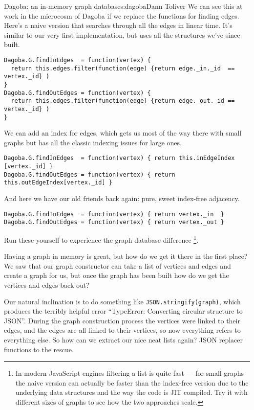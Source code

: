 \begin{aosachapter}{Dagoba: an in-memory graph database}{s:dagoba}{Dann Toliver}
We can see this at work in the microcosm of Dagoba if we replace the
functions for finding edges. Here's a naive version that searches
through all the edges in linear time. It's similar to our very first
implementation, but uses all the structures we've since built.

\begin{verbatim}
Dagoba.G.findInEdges  = function(vertex) {
  return this.edges.filter(function(edge) {return edge._in._id  == vertex._id} )
}
Dagoba.G.findOutEdges = function(vertex) {
  return this.edges.filter(function(edge) {return edge._out._id == vertex._id} )
}
\end{verbatim}

We can add an index for edges, which gets us most of the way there with
small graphs but has all the classic indexing issues for large ones.

\begin{verbatim}
Dagoba.G.findInEdges  = function(vertex) { return this.inEdgeIndex [vertex._id] }
Dagoba.G.findOutEdges = function(vertex) { return this.outEdgeIndex[vertex._id] }
\end{verbatim}

And here we have our old friends back again: pure, sweet index-free
adjacency.

\begin{verbatim}
Dagoba.G.findInEdges  = function(vertex) { return vertex._in  }
Dagoba.G.findOutEdges = function(vertex) { return vertex._out }
\end{verbatim}

Run these yourself to experience the graph database difference
\footnote{In modern JavaScript engines filtering a list is quite fast
  --- for small graphs the naive version can actually be faster than the
  index-free version due to the underlying data structures and the way
  the code is JIT compiled. Try it with different sizes of graphs to see
  how the two approaches scale.}.

\label{serialization}

Having a graph in memory is great, but how do we get it there in the
first place? We saw that our graph constructor can take a list of
vertices and edges and create a graph for us, but once the graph has
been built how do we get the vertices and edges back out?

Our natural inclination is to do something like
\texttt{JSON.stringify(graph)}, which produces the terribly helpful
error ``TypeError: Converting circular structure to JSON''. During the
graph construction process the vertices were linked to their edges, and
the edges are all linked to their vertices, so now everything refers to
everything else. So how can we extract our nice neat lists again? JSON
replacer functions to the rescue.


\end{aosachapter}
